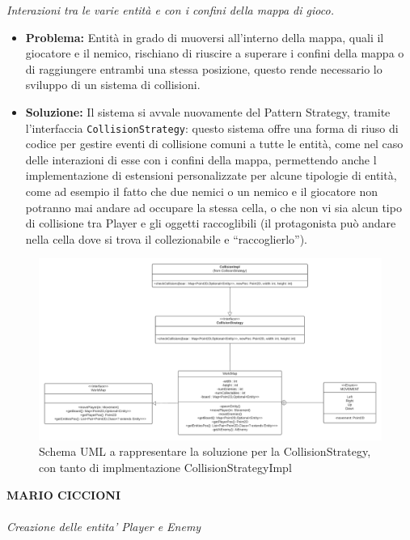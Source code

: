 \documentclass[a4paper,12pt]{report}
\begin{document}
\textit{Interazioni tra le varie entità e con i confini della mappa di gioco.}
\begin{itemize}
    \item \textbf{Problema:} Entità in grado di muoversi all’interno della mappa, quali il giocatore e il nemico, rischiano di riuscire a superare i confini della mappa o di raggiungere entrambi una stessa posizione, questo rende necessario lo sviluppo di un sistema di collisioni.
    \item \textbf{Soluzione:} Il sistema si avvale nuovamente del Pattern Strategy, tramite l’interfaccia \verb|CollisionStrategy|: questo sistema offre una forma di riuso di codice per gestire eventi di collisione comuni a tutte le entità, come nel caso delle interazioni di esse con i confini della mappa, permettendo anche l implementazione di estensioni personalizzate per alcune tipologie di entità, come ad esempio il fatto che due nemici o un nemico e il giocatore non potranno mai andare ad occupare la stessa cella, o che non vi sia alcun tipo di collisione tra Player e gli oggetti raccoglibili (il protagonista può andare nella cella dove si trova il collezionabile e “raccoglierlo”).
\end{itemize}
\begin{figure}[H]
\centering{}
\includegraphics[width=\textwidth,height=\textheight,keepaspectratio]{img/collisionStrategy.pdf}
\caption{Schema UML a rappresentare la soluzione per la CollisionStrategy, con tanto di implmentazione CollisionStrategyImpl}
\label{img:collisionStrategyUML}
\end{figure}
\textbf{MARIO CICCIONI}
\\ \\
\textit{Creazione delle entita' Player e Enemy}
\end{document}
